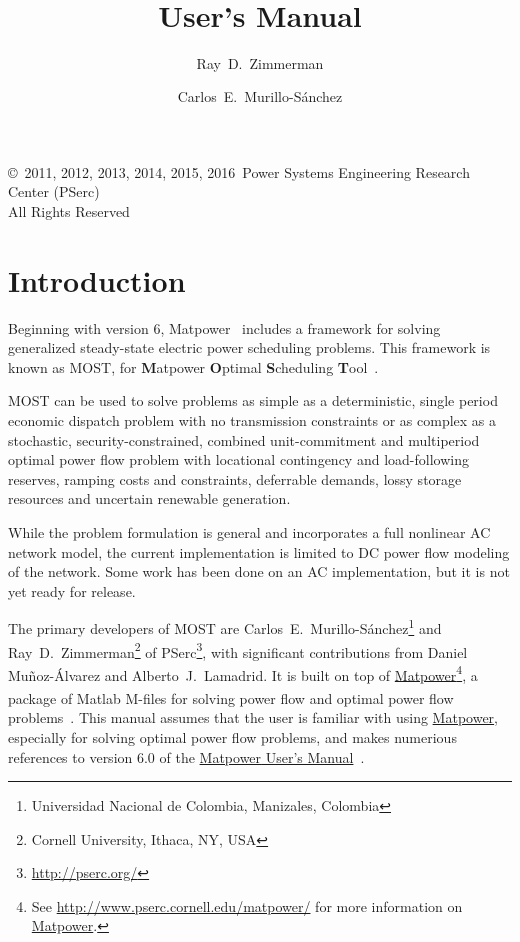 \documentclass[12pt]{article}
\title{\mostname{}\\\most{} \mostver{}\\
User's Manual}
\author{Ray~D.~Zimmerman \and Carlos~E.~Murillo-S\'anchez}
\newcommand{\mpver}[0]{6.0}
\newcommand{\matlab}[0]{{\sc Matlab}}
\newcommand{\matpower}[0]{{\sc Matpower}}
\newcommand{\matpowerurl}[0]{http://www.pserc.cornell.edu/matpower/}
\newcommand{\matpowerlink}[0]{\href{\matpowerurl}{\matpower{}}}
\newcommand{\most}[0]{{MOST}}
\newcommand{\mostname}[0]{{{\bf M}{\sc atpower} \textbf{O}ptimal \textbf{S}cheduling \textbf{T}ool}}
\newcommand{\pserc}[0]{{\sc PSerc}}
\newcommand{\PSERC}[0]{{Power Systems Engineering Research Center (\pserc{})}}
\newcommand{\mumurl}[0]{http://www.pserc.cornell.edu/matpower/docs/MATPOWER-manual-\mpver.pdf}
\newcommand{\mum}[0]{\href{\mumurl}{\matpower{} User's Manual}}
\numberwithin{equation}{section}
\numberwithin{table}{section}
\numberwithin{figure}{section}
\begin{document}
\maketitle
\thispagestyle{empty}
\vfill
\begin{center}
{\scriptsize
\copyright~2011, 2012, 2013, 2014, 2015, 2016~\PSERC{}\\
All Rights Reserved}
\end{center}

\clearpage
\tableofcontents
\clearpage
\listoffigures
\listoftables

\clearpage
\section{Introduction}

Beginning with version 6, \matpower{}~\cite{zimmerman2011} includes a framework for solving generalized steady-state electric power scheduling problems. This framework is known as \most{}, for \mostname{}~\cite{murillo-sanchez2013a}.

\most{} can be used to solve problems as simple as a deterministic, single period economic dispatch problem with no transmission constraints or as complex as a stochastic, security-constrained, combined unit-commitment and multiperiod optimal power flow problem with locational contingency and load-following reserves, ramping costs and constraints, deferrable demands, lossy storage resources and uncertain renewable generation.

While the problem formulation is general and incorporates a full nonlinear AC network model, the current implementation is limited to DC power flow modeling of the network. Some work has been done on an AC implementation, but it is not yet ready for release.

The primary developers of \most{} are Carlos~E.~Murillo-S\'anchez\footnote{Universidad Nacional de Colombia, Manizales, Colombia} and Ray~D.~Zimmerman\footnote{Cornell University, Ithaca, NY, USA} of \pserc{}\footnote{\url{http://pserc.org/}}, with significant contributions from Daniel Mu\~noz-\'Alvarez and Alberto~J.~Lamadrid. It is built on top of \matpowerlink{}\footnote{See \url{\matpowerurl} for more information on \matpowerlink{}.}, a package of \matlab{}\textsuperscript{\tiny \textregistered} M-files for solving power flow and optimal power flow problems~\cite{zimmerman2011, zimmerman2009}. This manual assumes that the user is familiar with using \matpowerlink{}, especially for solving optimal power flow problems, and makes numerious references to version \mpver{} of the \mum{}~\cite{matpower}.
\end{document}
